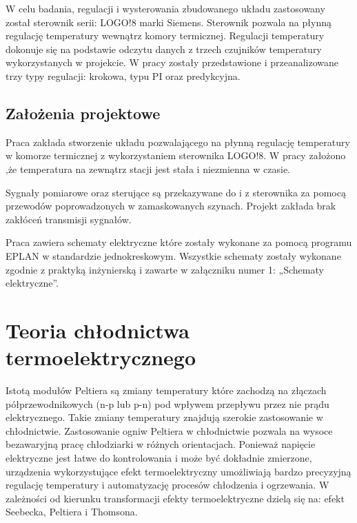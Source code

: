 \documentclass[oneside]{mgr}
\begin{document}
W celu badania, regulacji i wysterowania zbudowanego układu zastosowany został sterownik serii: LOGO!8 marki Siemens. Sterownik pozwala na płynną regulację temperatury wewnątrz komory termicznej. Regulacji temperatury dokonuje się na podstawie odczytu danych z trzech czujników temperatury wykorzystanych w projekcie. W pracy zostały przedstawione i przeanalizowane trzy typy regulacji: krokowa, typu PI oraz predykcyjna.

\section{Założenia projektowe}
Praca zakłada stworzenie układu pozwalającego na płynną regulację temperatury w komorze termicznej z wykorzystaniem sterownika LOGO!8. W pracy założono ,że temperatura na zewnątrz stacji jest stała i niezmienna w czasie.

Sygnały pomiarowe oraz sterujące są przekazywane do i z sterownika za pomocą przewodów poprowadzonych w zamaskowanych szynach. Projekt zakłada brak zakłóceń transmisji sygnałów.

Praca zawiera schematy elektryczne które zostały wykonane za pomocą programu EPLAN w standardzie jednokreskowym. Wszystkie schematy zostały wykonane zgodnie z praktyką inżynierską i zawarte w załączniku numer 1: „Schematy elektryczne”.

\chapter{Teoria chłodnictwa termoelektrycznego}
Istotą modułów Peltiera są zmiany temperatury które zachodzą na złączach półprzewodnikowych (n-p lub p-n) pod wpływem przepływu przez nie prądu elektrycznego. Takie zmiany temperatury znajdują szerokie zastosowanie w chłodnictwie. Zastosowanie ogniw Peltiera w chłodnictwie pozwala na wysoce bezawaryjną pracę chłodziarki w różnych orientacjach. 
Ponieważ napięcie elektryczne jest łatwe do kontrolowania i może być dokładnie zmierzone, urządzenia wykorzystujące efekt termoelektryczny umożliwiają bardzo precyzyjną regulację temperatury i automatyzację procesów chłodzenia i ogrzewania. W zależności od kierunku transformacji efekty termoelektryczne dzielą się na: efekt Seebecka, Peltiera i Thomsona.
\end{document}
